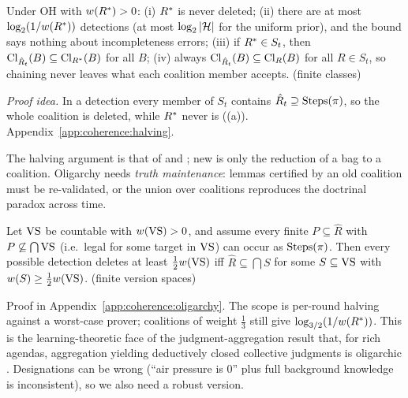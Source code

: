 \begin{theorem}\label{thm:coherence:halving}
Under OH with $w(R^{*})>0$: \textup{(i)} $R^{*}$ is never deleted; \textup{(ii)} there are at most $\log_2(1/w(R^{*}))$ detections (at most $\log_2|\mathcal{H}|$ for the uniform prior), and the bound says nothing about incompleteness errors; \textup{(iii)} if $R^{*}\in S_t$, then $\mathrm{Cl}_{\hat R_t}(B)\subseteq\mathrm{Cl}_{R^{*}}(B)$ for all $B$; \textup{(iv)} always $\mathrm{Cl}_{\hat R_t}(B)\subseteq\mathrm{Cl}_R(B)$ for all $R\in S_t$, so chaining never leaves what each coalition member accepts. \hfill{} (finite classes)
\end{theorem}

\noindent\emph{Proof idea.} In a detection every member of $S_t$ contains $\hat R_t\supseteq\mathrm{Steps}(\pi)$, so the whole coalition is deleted, while $R^{*}$ never is ((a)). Appendix~\ref{app:coherence:halving}.

The halving argument is that of \citet{barzdin1972prediction} and \citet{littlestone1988learning}; new is only the reduction of a bag to a coalition. Oligarchy needs \emph{truth maintenance}: lemmas certified by an old coalition must be re-validated, or the union over coalitions reproduces the doctrinal paradox across time.

\begin{proposition}\label{prop:coherence:oligarchy}
Let $\mathrm{VS}$ be countable with $w(\mathrm{VS})>0$, and assume every finite $P\subseteq\hat R$ with $P\not\subseteq\bigcap\mathrm{VS}$ (i.e.\ legal for some target in $\mathrm{VS}$) can occur as $\mathrm{Steps}(\pi)$. Then every possible detection deletes at least $\frac12w(\mathrm{VS})$ iff $\hat R\subseteq\bigcap S$ for some $S\subseteq\mathrm{VS}$ with $w(S)\ge\frac12w(\mathrm{VS})$. \hfill{} (finite version spaces)
\end{proposition}

Proof in Appendix~\ref{app:coherence:oligarchy}. The scope is per-round halving against a worst-case prover; coalitions of weight $\frac13$ still give $\log_{3/2}(1/w(R^{*}))$. This is the learning-theoretic face of the judgment-aggregation result that, for rich agendas, aggregation yielding deductively closed collective judgments is oligarchic \citep{gardenfors2006representation,dietrich2008judgment}. Designations can be wrong (``air pressure is $0$'' plus full background knowledge is inconsistent), so we also need a robust version.

